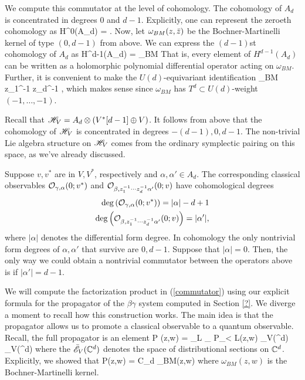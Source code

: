 \documentclass[10pt]{amsart}
\begin{document}
We compute this commutator at the level of cohomology.
The cohomology of $A_d$ is concentrated in degrees $0$ and $d-1$. 
Explicitly, one can represent the zeroeth cohomology as
\ben
H^0(A_d) = \CC[z_1,\ldots,z_d] .
\een
Now, let $\omega_{BM}(z,\Bar{z})$ be the Bochner-Martinelli kernel of type $(0,d-1)$ from above. 
We can express the $(d-1)$st cohomology of $A_d$ as
\ben
H^{d-1}(A_d) =  \cdot \omega_{BM} 
\een 
That is, every element of $H^{d-1}(A_d)$ can be written as a holomorphic polynomial differential operator acting on $\omega_{BM}$. 
Further, it is convenient to make the $U(d)$-equivariant identification 
\be\label{U(d) identification}
  \omega_{BM} \cong z_1^{-1} \cdots z_d^{-1} \CC[z_1^{-1}, \ldots, z_d^{-1}],
 \ee
which makes sense since $\omega_{BM}$ has $T^d \subset U(d)$-weight $(-1,\ldots,-1)$. 

Recall that $\mathscr H_V = A_d \otimes (V^*[d-1] \oplus V)$.
It follows from above that the cohomology of $\mathscr H_V$ is concentrated in degrees $-(d-1), 0, d-1$. 
The non-trivial Lie algebra structure on $\mathscr H_V$ comes from the ordinary symplectic pairing on this space, as we've already discussed. 

Suppose $v,v^*$ are in $V,V^*$, respectively and $\alpha,\alpha' \in A_d$.
The corresponding classical observables $\mathcal O_{\gamma,\alpha}(0;v^*)$ and $\mathcal O_{\beta, z_1^{-1}\cdots z_d^{-1} \alpha'}(0;v)$ have cohomological degrees
\begin{align*}
{\rm deg}\left(\mathcal O_{\gamma,\alpha}(0;v^*)\right) = |\alpha| - d + 1 \\
{\rm deg}\left(\mathcal O_{\beta, z_1^{-1}\cdots z_d^{-1} \alpha'}(0;v)\right) = |\alpha'|,
\end{align*}
where $|\alpha|$ denotes the differential form degree.
In cohomology the only nontrivial form degrees of $\alpha,\alpha'$ that survive are $0,d-1$. 
Suppose that $|\alpha| = 0$.
Then, the only way we could obtain a nontrivial commutator between the operators above is if $|\alpha'| = d-1$. 

We will compute the factorization product in (\ref{commutator}) using our explicit formula for the propagator of the $\beta\gamma$ system computed in Section \ref{?}.
We diverge a moment to recall how this construction works.
The main idea is that the propagator allows us to promote a classical observable to a quantum observable.
Recall, the full propagator is an element
\ben 
P (z,w) = \lim_{L\to \infty} \lim_{\epsilon {}} P_{\epsilon < L}(z,w) \in \Bar{\sE}_V(\CC^d) \Hat{\tensor} \Bar{\sE}_V(\CC^d)
\een
where the $\Bar{\mathscr E}_V(\mathbb C^d)$ denotes the space of distributional sections on $\mathbb C^d$.
Explicitly, we showed that 
\ben
P(z,w) = C_d \;\omega_{BM}(z,w) 
\een
where $\omega_{BM}(z,w)$ is the Bochner-Martinelli kernel.
\end{document}
